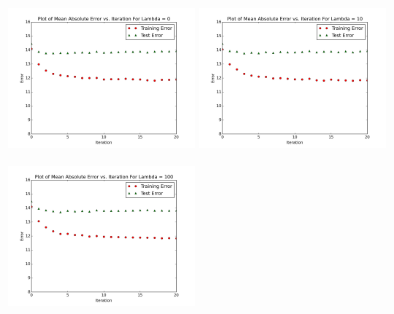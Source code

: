 \documentclass[12pt]{article}
\newcommand{\factwidth}{0.44}
\newcommand{\factheight}{1.6in}
\begin{document}
\begin{figure}[H]
\centering
\includegraphics[width=0\factwidth\textwidth,height=\factheight]{matrix_plots/test-i40d10l0.png}
\includegraphics[width=0\factwidth\textwidth,height=\factheight]{matrix_plots/test-i40d10l10.png}
\includegraphics[width=0\factwidth\textwidth,height=\factheight]{matrix_plots/test-i40d10l100.png}

\end{figure}
\end{document}
